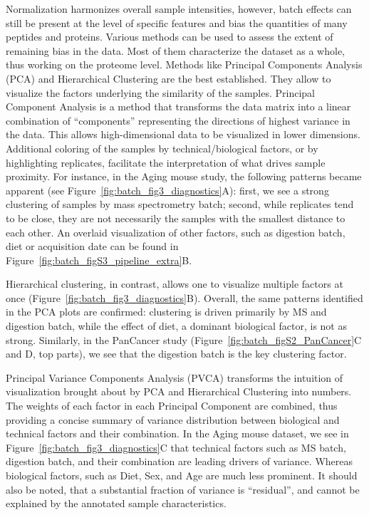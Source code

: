 \documentclass[num-refs]{wiley-article}
\begin{document}
Normalization harmonizes overall sample intensities, however, batch effects can still be present at the level of specific features and bias the quantities of many peptides and proteins.
Various methods can be used to assess the extent of remaining bias in the data. Most of them characterize the dataset as a whole, thus working on the proteome level. Methods like Principal Components Analysis (PCA) and Hierarchical Clustering are the best  established. They allow to visualize the factors underlying the similarity of the samples.
Principal Component Analysis is a method that transforms the data matrix into a linear combination of “components” representing the directions of highest variance in the data. This allows high-dimensional data to be visualized in lower dimensions. Additional coloring of the samples by technical/biological factors, or by highlighting replicates, facilitate the interpretation of what drives sample proximity. For instance, in the Aging mouse study, the following patterns became apparent (see Figure~\ref{fig:batch_fig3_diagnostics}A): first, we see a strong clustering of samples by mass spectrometry batch; second, while replicates tend to be close, they are not necessarily the samples with the smallest distance to each other. An overlaid visualization of other factors, such as digestion batch, diet or acquisition date can be found in Figure~\ref{fig:batch_figS3_pipeline_extra}B. 
 
Hierarchical clustering, in contrast, allows one to visualize multiple factors at once (Figure~\ref{fig:batch_fig3_diagnostics}B). Overall, the same patterns identified in the PCA plots are confirmed: clustering is driven primarily by MS and digestion batch, while the effect of diet, a dominant biological factor, is not as strong. Similarly, in the PanCancer study (Figure~\ref{fig:batch_figS2_PanCancer}{C and D, top parts}), we see that the digestion batch is the key clustering factor.

Principal Variance Components Analysis (PVCA) transforms the intuition of visualization brought about by PCA and Hierarchical Clustering into numbers. The weights of each factor in each Principal Component are combined, thus providing a concise summary of variance distribution between biological and technical factors and their combination. In the Aging mouse dataset, we see in Figure~\ref{fig:batch_fig3_diagnostics}C that technical factors such as MS batch, digestion batch, and their combination are leading drivers of variance. Whereas biological factors, such as Diet, Sex, and Age are much less prominent. It should also be noted, that a substantial fraction of variance is “residual”, and cannot be explained by the annotated sample characteristics.
\end{document}
